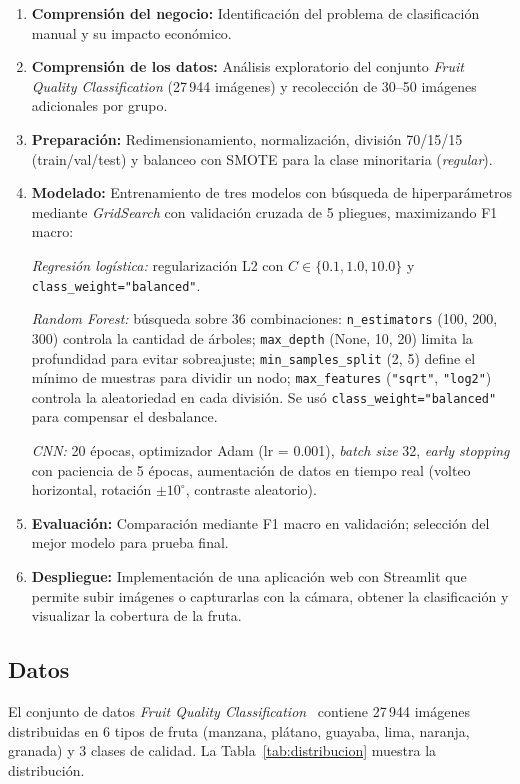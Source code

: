 \documentclass[conference]{IEEEtran}
\begin{document}
\begin{enumerate}[leftmargin=*,nosep]
  \item \textbf{Comprensión del negocio:} Identificación del problema de clasificación manual y su impacto económico.
  \item \textbf{Comprensión de los datos:} Análisis exploratorio del conjunto \emph{Fruit Quality Classification} (27\,944 imágenes) y recolección de 30--50 imágenes adicionales por grupo.
  \item \textbf{Preparación:} Redimensionamiento, normalización, división 70/15/15 (train/val/test) y balanceo con SMOTE para la clase minoritaria (\emph{regular}).
  \item \textbf{Modelado:} Entrenamiento de tres modelos con búsqueda de hiperparámetros mediante \emph{GridSearch} con validación cruzada de 5 pliegues, maximizando F1 macro:\par
    \emph{Regresión logística:} regularización L2 con \(C \in \{0.1, 1.0, 10.0\}\) y \texttt{class\_weight="balanced"}.\par
    \emph{Random Forest:} búsqueda sobre 36 combinaciones: \texttt{n\_estimators} (100, 200, 300) controla la cantidad de árboles; \texttt{max\_depth} (None, 10, 20) limita la profundidad para evitar sobreajuste; \texttt{min\_samples\_split} (2, 5) define el mínimo de muestras para dividir un nodo; \texttt{max\_features} (\texttt{"sqrt"}, \texttt{"log2"}) controla la aleatoriedad en cada división. Se usó \texttt{class\_weight="balanced"} para compensar el desbalance.\par
    \emph{CNN:} 20 épocas, optimizador Adam (lr = 0.001), \emph{batch size} 32, \emph{early stopping} con paciencia de 5 épocas, aumentación de datos en tiempo real (volteo horizontal, rotación \(\pm 10^\circ\), contraste aleatorio).
  \item \textbf{Evaluación:} Comparación mediante F1 macro en validación; selección del mejor modelo para prueba final.
  \item \textbf{Despliegue:} Implementación de una aplicación web con Streamlit que permite subir imágenes o capturarlas con la cámara, obtener la clasificación y visualizar la cobertura de la fruta.
\end{enumerate}

\subsection{Datos}
El conjunto de datos \emph{Fruit Quality Classification}~\cite{kaggle_fruit} contiene 27\,944 imágenes distribuidas en 6 tipos de fruta (manzana, plátano, guayaba, lima, naranja, granada) y 3 clases de calidad. La Tabla~\ref{tab:distribucion} muestra la distribución.
\end{document}
